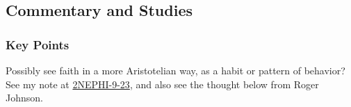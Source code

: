 

	
	
	
	
\subsection{Commentary and Studies} %
	\label{FAITH-COMMENTARY}

	\subsubsection{Key Points}
		\label{FAITH-KEYS}
	
		\begin{compactitem}
			\item Possibly see faith in a more Aristotelian way, as a habit or pattern of behavior? See my note at \hyperref[2NEPHI-9-23]{2NEPHI-9-23}, and also see the thought below from Roger Johnson.
		\end{compactitem}
		
